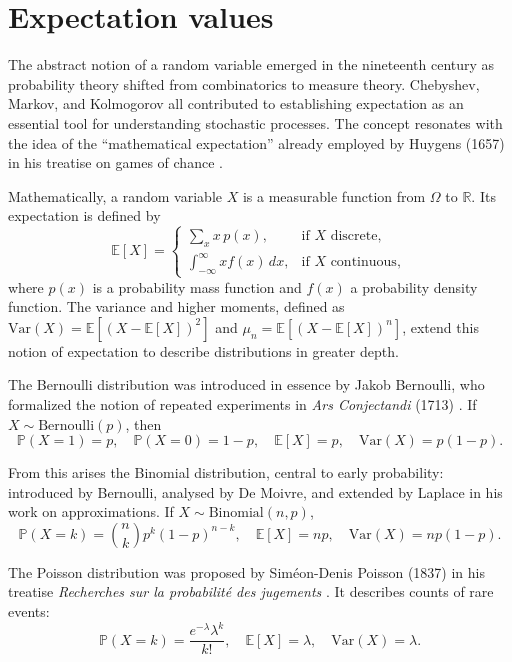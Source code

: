 \documentclass{book}
\begin{document}
\newpage

\section{Expectation values}

The abstract notion of a random variable emerged in the nineteenth century as probability theory shifted from combinatorics to measure theory. Chebyshev, Markov, and Kolmogorov all contributed to establishing expectation as an essential tool for understanding stochastic processes. The concept resonates with the idea of the “mathematical expectation” already employed by Huygens (1657) in his treatise on games of chance \cite{huygens-games}.

Mathematically, a random variable $X$ is a measurable function from $\Omega$ to $\mathbb{R}$. Its expectation is defined by
\[
\mathbb{E}[X] = 
\begin{cases}
\sum_{x} x \, p(x), & \text{if $X$ discrete}, \\
\int_{-\infty}^\infty x f(x)\, dx, & \text{if $X$ continuous},
\end{cases}
\]
where $p(x)$ is a probability mass function and $f(x)$ a probability density function. The variance and higher moments, defined as $\mathrm{Var}(X) = \mathbb{E}[(X-\mathbb{E}[X])^2]$ and $\mu_n = \mathbb{E}[(X-\mathbb{E}[X])^n]$, extend this notion of expectation to describe distributions in greater depth.

The Bernoulli distribution was introduced in essence by Jakob Bernoulli, who formalized the notion of repeated experiments in \emph{Ars Conjectandi} (1713) \cite{bernoulli-ars}. If $X \sim \text{Bernoulli}(p)$, then
\[
\mathbb{P}(X=1)=p, \quad \mathbb{P}(X=0)=1-p, \quad \mathbb{E}[X] = p, \quad \mathrm{Var}(X) = p(1-p).
\]

From this arises the Binomial distribution, central to early probability: introduced by Bernoulli, analysed by De Moivre, and extended by Laplace in his work on approximations. If $X \sim \text{Binomial}(n, p)$,
\[
\mathbb{P}(X=k)=\binom{n}{k} p^k (1-p)^{n-k}, \quad 
\mathbb{E}[X] = np, \quad \mathrm{Var}(X)=np(1-p).
\]

The Poisson distribution was proposed by Siméon-Denis Poisson (1837) in his treatise \emph{Recherches sur la probabilité des jugements} \cite{poisson-judgements}. It describes counts of rare events:
\[
\mathbb{P}(X=k)=\frac{e^{-\lambda}\lambda^k}{k!}, \quad 
\mathbb{E}[X]=\lambda, \quad \mathrm{Var}(X)=\lambda.
\]
\end{document}
